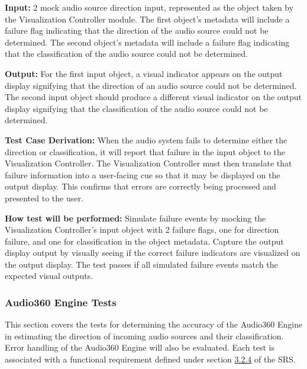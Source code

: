 \documentclass[12pt, titlepage]{article}
\begin{document}
\begin{enumerate}
\textbf{Input:}
2 mock audio source direction input, represented as the object taken by the 
Visualization Controller module. The first object's metadata will include a 
failure flag indicating that the direction of the audio source could not be
determined. The second object's metadata will include a failure flag indicating 
that the classification of the audio source could not be determined.
					
\textbf{Output:}
For the first input object, a visual indicator appears on the output display 
signifying that the direction of an audio source could not be determined. 
The second input object should produce a different visual indicator on the 
output display signifying that the classification of the audio source could not
be determined. 

\textbf{Test Case Derivation:} 
When the audio system fails to determine either the direction or classification,
 it will report that failure in the input object to the Visualization Controller.
 The Visualization Controller must then translate that failure information into 
a user-facing cue so that it may be displayed on the output display. This 
confirms that errors are correctly being processed and presented to the user. 
					
\textbf{How test will be performed:}
Simulate failure events by mocking the Visualization Controller's input object 
with 2 failure flags, one for direction failure, and one for classification in 
the object metadata. Capture the output display output by visually seeing if 
the correct failure indicators are visualized on the output display. The test 
passes if all simulated failure events match the expected visual outputs.

\end{enumerate}

\subsubsection{Audio360 Engine Tests}

This section covers the tests for determining the accuracy of the Audio360 
Engine in estimating the direction of incoming audio sources and their 
classification. Error handling of the Audio360 Engine will also 
be evaluated. Each test is 
associated with a functional requirement defined under section 
\hyperref[SRS-sec:FR4]{3.2.4} of the SRS. 
\end{document}
